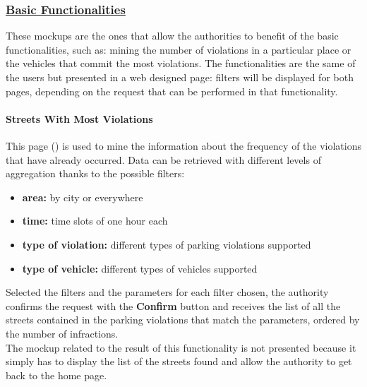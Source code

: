 				\newpage
			
			\subsubsection[Basic Functionalities]{\hyperlink{toc}{Basic Functionalities}}
				\label{sec:authorityBasicFunctionalities}
				
				These mockups are the ones that allow the authorities to benefit of the basic functionalities, such as: mining the number of violations in a particular place or the vehicles that commit the most violations. The functionalities are the same of the users but presented in a web designed page: filters will be displayed for both pages, depending on the request that can be performed in that functionality.
				
				\paragraph{Streets With Most Violations}
				This page () is used to mine the information about the frequency of the violations that have already occurred. Data can be retrieved with different levels of aggregation thanks to the possible filters:
				
				\begin{itemize}
					\item \textbf{area:} by city or everywhere
					\item \textbf{time:} time slots of one hour each
					\item \textbf{type of violation:} different types of parking violations supported
					\item \textbf{type of vehicle:} different types of vehicles supported
				\end{itemize}
			
				Selected the filters and the parameters for each filter chosen, the authority confirms the request with the \textbf{Confirm} button and receives the list of all the streets contained in the parking violations that match the parameters, ordered by the number of infractions.\\
				
				The mockup related to the result of this functionality is not presented because it simply has to display the list of the streets found and allow the authority to get back to the home page.
				
				\vspace{0.1cm}
				
